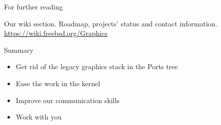 \documentclass{beamer}
\begin{document}
\begin{frame}{For further reading}
  \begin{thebibliography}{10}

  \beamertemplatearticlebibitems

    Our wiki section.
    \newblock Roadmap, projects' status and contact information.
    \newblock \url{https://wiki.freebsd.org/Graphics}
  \end{thebibliography}

\end{frame}

\begin{frame}{Summary}
  \begin{itemize}
    \item Get rid of the legacy graphics stack in the Ports tree
    \item Ease the work in the kernel
    \item Improve our communication skills
    \item Work with you
  \end{itemize}
\end{frame}
\end{document}
